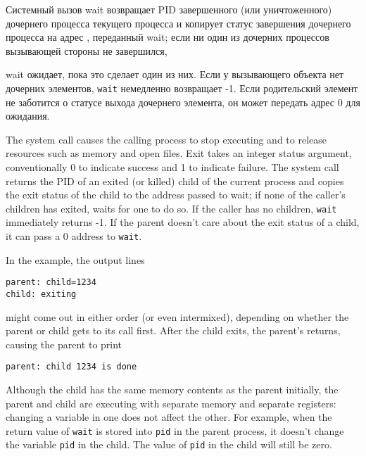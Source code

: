Системный
вызов wait возвращает PID завершенного (или уничтоженного) дочернего процесса
текущего процесса и копирует статус завершения дочернего процесса на адрес
, переданный wait; если ни один из дочерних процессов вызывающей
стороны не завершился,

wait ожидает, пока это сделает один из них.
Если у вызывающего объекта нет дочерних элементов, \lstinline{wait} немедленно
возвращает -1.
Если родительский элемент не заботится о статусе выхода дочернего элемента, он может
передать адрес 0 для
ожидания.

The
system call causes the calling process to stop executing and
to release resources such as memory and open files.
Exit takes an integer status argument,
conventionally 0 to indicate success and 1 to indicate failure.
The
system call returns the PID of an exited (or killed) child of the
current process and copies the exit status of the child to the address
passed to wait; if none of the caller's children
has exited,
waits for one to do so.
If the caller has no children, \lstinline{wait} immediately
returns -1.
If the parent doesn't care about the exit status of a child, it can
pass a 0 address to
\lstinline{wait}.

\iffalse
In the example, the output lines
\begin{lstlisting}[]
parent: child=1234
child: exiting
\end{lstlisting}
might come out in either order (or even intermixed), depending on whether the
parent or child gets to its
call first.
After the child exits, the parent's
returns, causing the parent to print
\begin{lstlisting}[]
parent: child 1234 is done
\end{lstlisting}
Although the child has the same memory contents as the parent initially, the
parent and child are executing with separate memory and separate registers:
changing a variable in one does not affect the other. For example, when the
return value of
\lstinline{wait}
is stored into
\lstinline{pid}
in the parent process,
it doesn't change the variable
\lstinline{pid}
in the child.  The value of
\lstinline{pid}
in the child will still be zero.

